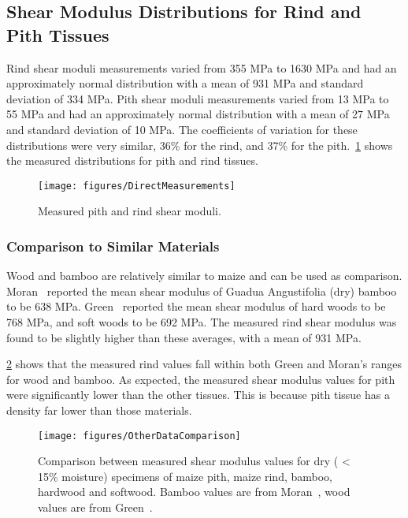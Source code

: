 \subsection{Shear Modulus Distributions for Rind and Pith Tissues}
\label{ssec:shear_modulus_distributions_for_rind_and_pith_tissues}
Rind shear moduli measurements varied from 355 MPa to 1630 MPa and had an approximately normal distribution with a mean of 931 MPa and standard deviation of 334 MPa. Pith shear moduli measurements varied from 13 MPa to 55 MPa and had an approximately normal distribution with a mean of 27 MPa and standard deviation of 10 MPa.  The coefficients of variation for these distributions were very similar, 36\% for the rind, and 37\% for the pith.~\cref{fig:DirectMeasurements} shows the measured distributions for pith and rind tissues.

\begin{figure}[htbp]
	\centering
	\texttt{[image: figures/DirectMeasurements]}
	\caption[Measured pith and rind shear moduli.]{Measured pith and rind shear moduli.}
	\label{fig:DirectMeasurements}
\end{figure}

\subsubsection{Comparison to Similar Materials}
\label{sssec:comparison_to_similar_materials}
Wood and bamboo are relatively similar to maize and can be used as comparison. Moran~ reported the mean shear modulus of Guadua Angustifolia (dry) bamboo to be 638 MPa. Green~ reported the mean shear modulus of hard woods to be 768 MPa, and soft woods to be 692 MPa. The measured rind shear modulus was found to be slightly higher than these averages, with a mean of 931 MPa. 

\cref{fig:OtherDataComparison} shows that the measured rind values fall within both Green and Moran’s ranges for wood and bamboo. As expected, the measured shear modulus values for pith were significantly lower than the other tissues. This is because pith tissue has a density far lower than those materials.

\begin{figure}[htbp]
	\centering
	\texttt{[image: figures/OtherDataComparison]}
	\caption[Comparison between measured shear modulus values for dry specimens of maize pith, maize rind, bamboo, hardwood and softwood.]{Comparison between measured shear modulus values for dry ( < 15\% moisture) specimens of maize pith, maize rind, bamboo, hardwood and softwood. Bamboo values are from Moran~\protect\cite{moran_new_2017}, wood values are from Green~\protect\cite{green_wood_1999}.}
	\label{fig:OtherDataComparison}
\end{figure}

